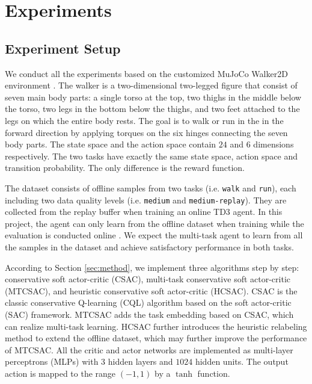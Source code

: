 \section{Experiments}
\label{sec:experiments}

\subsection{Experiment Setup}

We conduct all the experiments based on the customized MuJoCo Walker2D environment \cite{todorov2012mujoco}. The walker is a two-dimensional two-legged figure that consist of seven main body parts: a single torso at the top, two thighs in the middle below the torso, two legs in the bottom below the thighs, and two feet attached to the legs on which the entire body rests. The goal is to walk or run in the in the forward direction by applying torques on the six hinges connecting the seven body parts. The state space and the action space contain $24$ and $6$ dimensions respectively. The two tasks have exactly the same state space, action space and transition probability. The only difference is the reward function.

The dataset consists of offline samples from two tasks (i.e. \texttt{walk} and \texttt{run}), each including two data quality levels (i.e. \texttt{medium} and \texttt{medium-replay}). They are collected from the replay buffer when training an online TD3 agent. In this project, the agent can only learn from the offline dataset when training while the evaluation is conducted online \cite{fu2020d4rl}. We expect the multi-task agent to learn from all the samples in the dataset and achieve satisfactory performance in both tasks.

According to Section \ref{sec:method}, we implement three algorithms step by step: conservative soft actor-critic (CSAC), multi-task conservative soft actor-critic (MTCSAC), and heuristic conservative soft actor-critic (HCSAC). CSAC is the classic conservative Q-learning (CQL) algorithm based on the soft actor-critic (SAC) framework. MTCSAC adds the task embedding based on CSAC, which can realize multi-task learning. HCSAC further introduces the heuristic relabeling method to extend the offline dataset, which may further improve the performance of MTCSAC. All the critic and actor networks are implemented as multi-layer perceptrons (MLPs) \cite{rumelhart1986learning} with $3$ hidden layers and $1024$ hidden units. The output action is mapped to the range $(-1, 1)$ by a $\tanh$ function.

